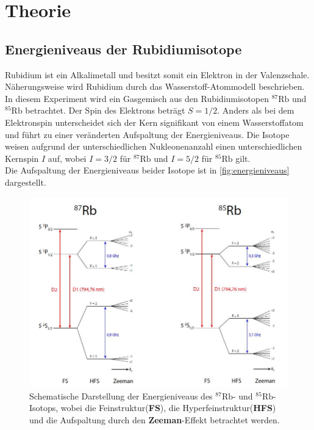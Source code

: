 \section{Theorie}
\label{sec:Theorie}

\subsection{Energieniveaus der Rubidiumisotope}
\label{sec:aufspaltung}
Rubidium ist ein Alkalimetall und besitzt somit ein Elektron in der Valenzschale.
Näherungsweise wird Rubidium durch das Wasserstoff-Atommodell beschrieben.
In diesem Experiment wird ein Gasgemisch aus den Rubidiumisotopen $^{87}\text{Rb}$ und $^{85}\text{Rb}$ betrachtet.
Der Spin des Elektrons beträgt $S=1/2$.
Anders als bei dem Elektronspin unterscheidet sich der Kern signifikant von einem Wasserstoffatom und führt zu einer veränderten Aufspaltung der Energieniveaus.
Die Isotope weisen aufgrund der unterschiedlichen Nukleonenanzahl einen unterschiedlichen Kernspin $I$ auf, wobei $I=3/2$ für $^{87}\text{Rb}$ und $I=5/2$ für $^{85}\text{Rb}$ gilt.
\\
Die Aufspaltung der Energieniveaus beider Isotope ist in \autoref{fig:energieniveaus} dargestellt.
\begin{figure}
    \centering
    \includegraphics[width=1\textwidth]{content/img/energieniveaus2.png}
    \caption{Schematische Darstellung der Energieniveaus des $^{87}\text{Rb}$- und $^{85}\text{Rb}$-Isotops, 
    wobei die Feinstruktur(\textbf{FS}), die Hyperfeinstruktur(\textbf{HFS}) und die Aufspaltung durch den \textbf{Zeeman}-Effekt betrachtet werden. \cite{borgo}}
    \label{fig:energieniveaus}
\end{figure}
